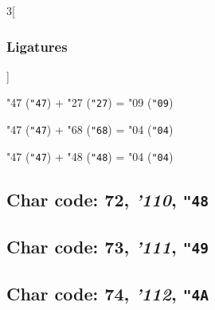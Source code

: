 \documentclass{article}
\newlength{\maxcharwidth}
\begin{document}
\begin{multicols}{3}[\subsubsection{Ligatures}]

{\testfont\char"47\noboundary} ({\tt"47}) + {\testfont\char"27\noboundary} ({\tt"27}) = {\testfont\char"09\noboundary} ({\tt"09}) 

{\testfont\char"47\noboundary} ({\tt"47}) + {\testfont\char"68\noboundary} ({\tt"68}) = {\testfont\char"04\noboundary} ({\tt"04}) 

{\testfont\char"47\noboundary} ({\tt"47}) + {\testfont\char"48\noboundary} ({\tt"48}) = {\testfont\char"04\noboundary} ({\tt"04}) 

\end{multicols}

\subsection{Char code: 72, {\it'110}, {\tt"48}}
\label{char_72}


\subsection{Char code: 73, {\it'111}, {\tt"49}}
\label{char_73}


\subsection{Char code: 74, {\it'112}, {\tt"4A}}
\label{char_74}

\end{document}
